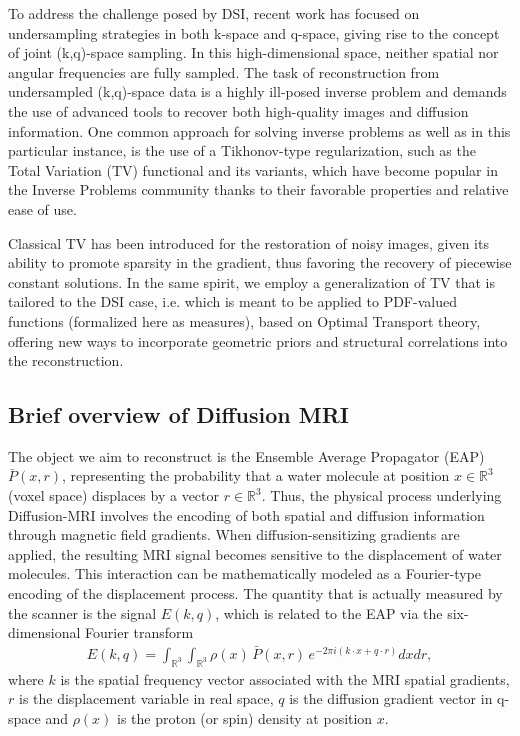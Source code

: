 \documentclass[journal,twoside,web]{ieeecolor}
\newcommand{\R}{\mathbb{R}}
\begin{document}
To address the challenge posed by DSI, recent work has focused on undersampling strategies in both k-space and q-space, giving rise to the concept of joint (k,q)-space sampling. In this high-dimensional space, neither spatial nor angular frequencies are fully sampled. The task of reconstruction from undersampled (k,q)-space data is a highly ill-posed inverse problem and demands the use of advanced tools to recover both high-quality images and diffusion information. One common approach for solving inverse problems as well as in this particular instance, is the use of a Tikhonov-type regularization, such as the Total Variation (TV) functional and its variants, which have become popular in the Inverse Problems community thanks to their favorable properties and relative ease of use.

Classical TV has been introduced for the restoration of noisy images, given its ability to promote sparsity in the gradient, thus favoring the recovery of piecewise constant solutions. In the same spirit, we employ a generalization of TV that is tailored to the DSI case, i.e. which is meant to be applied to PDF-valued functions (formalized here as measures), based on Optimal Transport theory, offering new ways to incorporate geometric priors and structural correlations into the reconstruction.

\subsection{Brief overview of Diffusion MRI}
The object we aim to reconstruct is the Ensemble Average Propagator (EAP) $\bar{P}(x,r)$, representing the probability that a water molecule at position $x \in \R^3$ (voxel space) displaces by a vector $r \in \R^3$. Thus, the physical process underlying Diffusion-MRI involves the encoding of both spatial and diffusion information through magnetic field gradients. When diffusion-sensitizing gradients are applied, the resulting MRI signal becomes sensitive to the displacement of water molecules. This interaction can be mathematically modeled as a {Fourier-type encoding} of the displacement process. The quantity that is actually measured by the scanner is the signal \( E(k,q) \), which is related to the EAP via the six-dimensional Fourier transform
\begin{align}
    E(k,q) =
    \int_{\R^3}\int_{\R^3} \rho(x) \, \bar{P}(x,r) \, e^{-2\pi i(k \cdot x + q \cdot r)} dx dr,
\end{align}
where $k$ is the spatial frequency vector associated with the MRI spatial gradients, $r$ is the displacement variable in real space, $q$ is the diffusion gradient vector in q-space and $\rho(x)$ is the proton (or spin) density at position $x$.
\end{document}
